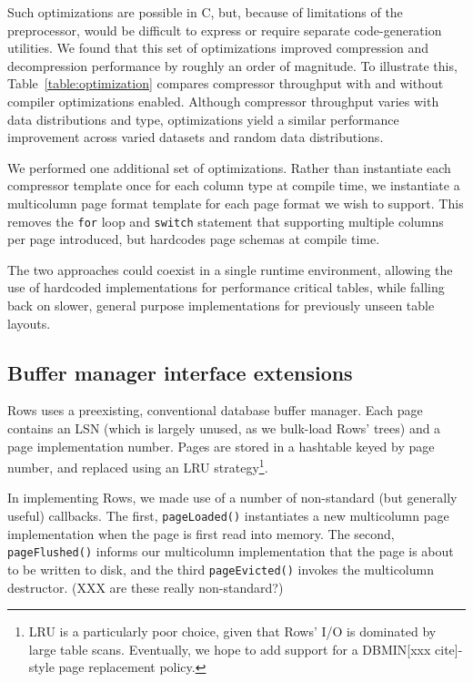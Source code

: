 \documentclass{sig-alternate-sigmod08}
\newcommand{\rows}{Rows\xspace}
\newcommand{\rowss}{Rows'\xspace}
\begin{document}
Such optimizations are possible in C, but, because of limitations of
the preprocessor, would be difficult to express or require separate
code-generation utilities.  We found that this set of optimizations
improved compression and decompression performance by roughly an order
of magnitude.  To illustrate this, Table~\ref{table:optimization}
compares compressor throughput with and without compiler optimizations
enabled.  Although compressor throughput varies with data distributions
and type, optimizations yield a similar performance improvement across
varied datasets and random data distributions.

We performed one additional set of optimizations.  Rather than
instantiate each compressor template once for each column type at
compile time, we instantiate a multicolumn page format template for
each page format we wish to support.  This removes the {\tt for} loop
and {\tt switch} statement that supporting multiple columns per page
introduced, but hardcodes page schemas at compile time.

The two approaches could coexist in a single runtime environment,
allowing the use of hardcoded implementations for performance critical
tables, while falling back on slower, general purpose implementations
for previously unseen table layouts.

\subsection{Buffer manager interface extensions}

\rows uses a preexisting, conventional database buffer manager.  Each
page contains an LSN (which is largely unused, as we bulk-load \rowss
trees) and a page implementation number.  Pages are stored in a
hashtable keyed by page number, and replaced using an LRU
strategy\footnote{LRU is a particularly poor choice, given that \rowss
  I/O is dominated by large table scans.  Eventually, we hope to add
  support for a DBMIN[xxx cite]-style page replacement policy.}.

In implementing \rows, we made use of a number of non-standard (but
generally useful) callbacks.  The first, {\tt pageLoaded()}
instantiates a new multicolumn page implementation when the page is
first read into memory.  The second, {\tt pageFlushed()} informs our
multicolumn implementation that the page is about to be written to
disk, and the third {\tt pageEvicted()} invokes the multicolumn
destructor.  (XXX are these really non-standard?)
\end{document}
